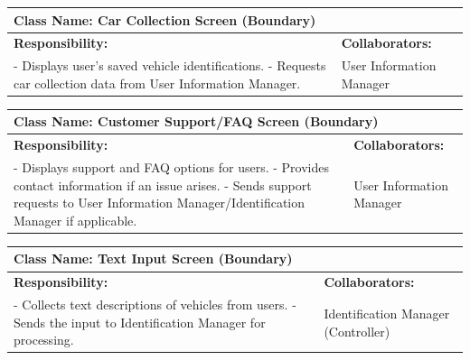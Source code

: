 \documentclass[]{article}
\begin{document}
\begin{table}[ht]
    \centering
    \begin{tabular}{|p{7cm}|p{7cm}|}
    \hline
     \multicolumn{2}{|l|}{\textbf{Class Name: Car Collection Screen (Boundary)}} \\
    \hline
    \textbf{Responsibility:} & \textbf{Collaborators:} \\
    \hline
    - Displays user’s saved vehicle identifications. \newline
    - Requests car collection data from User Information Manager.
    &
    User Information Manager \\
    \hline
    \end{tabular}
\end{table}

\begin{table}[ht]
    \centering
    \begin{tabular}{|p{7cm}|p{7cm}|}
    \hline
     \multicolumn{2}{|l|}{\textbf{Class Name: Customer Support/FAQ Screen (Boundary)}} \\
    \hline
    \textbf{Responsibility:} & \textbf{Collaborators:} \\
    \hline
    - Displays support and FAQ options for users. \newline
    - Provides contact information if an issue arises. \newline
    - Sends support requests to User Information Manager/Identification Manager if applicable.
    &
    User Information Manager \\
    \hline
    \end{tabular}
\end{table}

\begin{table}[ht]
    \centering
    \begin{tabular}{|p{7cm}|p{7cm}|}
    \hline
     \multicolumn{2}{|l|}{\textbf{Class Name: Text Input Screen (Boundary)}} \\
    \hline
    \textbf{Responsibility:} & \textbf{Collaborators:} \\
    \hline
    - Collects text descriptions of vehicles from users. \newline
    - Sends the input to Identification Manager for processing.
    &
    Identification Manager (Controller) \\
    \hline
    \end{tabular}
\end{table}
\end{document}
